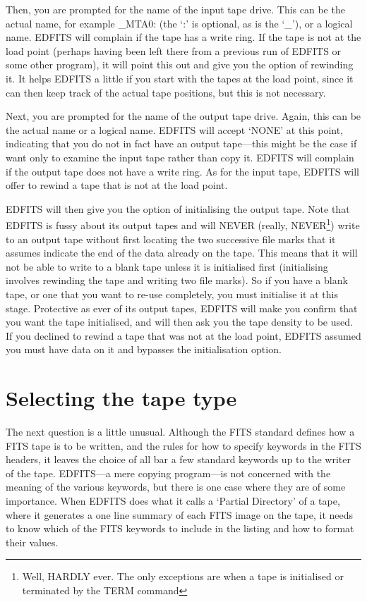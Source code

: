 Then, you are prompted for the name of the input tape drive.  This can be 
the actual name, for example \_MTA0: (the `:' is optional, as is the `\_'),
or a logical name.  EDFITS will complain if the tape has a write ring.  If
the tape is not at the load point (perhaps having been left there from a
previous run of EDFITS or some other program), it will point this out and 
give you the option of rewinding it.  It helps EDFITS a little if you start 
with the tapes at the load point, since it can then keep track of the actual
tape positions, but this is not necessary.

Next, you are prompted for the name of the output tape drive.  Again, this
can be the actual name or a logical name.  EDFITS will accept `NONE' at this
point, indicating that you do not in fact have an output tape---this might be
the case if want only to examine the input tape rather than copy it.  EDFITS
will complain if the output tape does not have a write ring.  As for the
input tape, EDFITS will offer to rewind a tape that is not at the load point.

EDFITS will then give you the option of initialising the output tape.  Note
that EDFITS is fussy about its output tapes and will NEVER (really, 
NEVER\footnote{Well, HARDLY ever.  The only exceptions are when a tape is 
initialised or terminated by the TERM command})
write to an output tape without first locating the two successive file marks
that it assumes indicate the end of the data already on the tape.  This means
that it will not be able to write to a blank tape unless it is initialised
first (initialising involves rewinding the tape and writing two file marks).
So if you have a blank tape, or one that you want to re-use completely, you
must initialise it at this stage.  Protective as ever of its output tapes,
EDFITS will make you confirm that you want the tape initialised, and will
then ask you the tape density to be used.  If you declined to rewind a tape
that was not at the load point, EDFITS assumed you must have data on it and
bypasses the initialisation option.

\section{Selecting the tape type}

The next question is a little unusual.  Although the FITS standard defines
how a FITS tape is to be written, and the rules for how to specify keywords
in the FITS headers, it leaves the choice of all bar a few standard keywords
up to the writer of the tape.  EDFITS---a mere copying program---is not
concerned with the meaning of the various keywords, but there is one case
where they are of some importance.  When EDFITS does what it calls a
`Partial Directory' of a tape, where it generates a one line summary of 
each FITS image on the tape, it needs to know which of the FITS keywords to
include in the listing and how to format their values.

